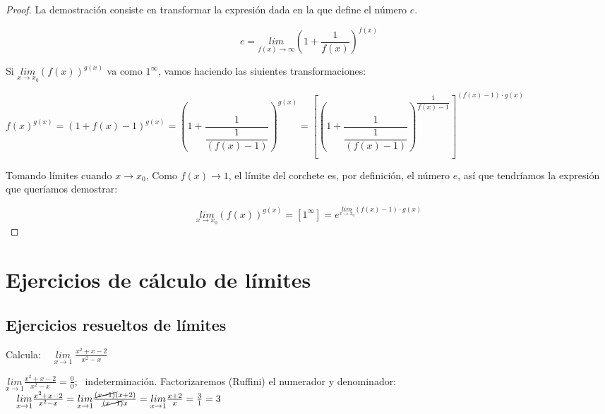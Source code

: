 	
	\begin{proof} La demostración consiste en transformar la expresión dada en la que define el número $e$.
	
		\begin{equation*}
		e=\underset {f(x)\to \infty}{lim} { {\left( 1+\dfrac {1}{f(x)} \right) }^{f(x)}}
		\end{equation*}
		
		Si $ \underset {x\to x_0}{lim}{{\left( f(x)\right)}^{g(x)} } $ va como $1^\infty$, vamos haciendo las siuientes transformaciones:
		
		\scriptsize{\vspace{2mm}$f(x)^{g(x)}= (1+f(x)-1)^{g(x)}=\left(1+\dfrac {1}{\dfrac {1}{(f(x)-1)}} \right)^{g(x)}=\left[  
			\left(1+\dfrac {1}{\dfrac {1}{(f(x)-1)}}\right)^{\dfrac {1}{f(x)-1}} 
			\right]^{(f(x)-1)\cdot g(x)}\quad $ } \normalsize
		
		Tomando límites cuando $x \to x_0$, Como $f(x)\to 1$, el límite del corchete es, por definición, el número $e$, así que tendríamos la expresión que queríamos demostrar:
		
		\begin{equation*}
			 \underset {x\to x_0}{lim}{{\left( f(x)\right)}^{g(x)} }=[1^\infty]=e^{\underset {x \to x_0}{lim}{(f(x)-1)\cdot g(x)}}	
		\end{equation*}
		 
		
	\end{proof}
	
	\section{Ejercicios de cálculo de límites}
	\subsection{Ejercicios resueltos de límites}	
	
	
	\begin{ejre} Calcula: $\quad \underset {x\to 1}{lim}\; { \frac {x^2+x-2}{x^2-x}}$
	
	\end{ejre}
	
	\begin{proofw}\renewcommand{\qedsymbol}{$\diamond$}
	
		$\underset {x\to 1}{lim}{ \frac {x^2+x-2}{x^2-x}}=\frac 0 0; \; $ indeterminación. Factorizaremos (Ruffini) el numerador y {denominador}:
		$\quad \underset {x\to 1}{lim}{ \frac {x^2+x-2}{x^2-x}}=
		\underset {x\to 1}{lim}{ \frac {\cancel{(x-1)}(x+2)}{\cancel{(x-1)}x}} = \underset {x\to 1}{lim}{\frac {x+2}{x}}=\frac 3 1 = 3$
	\end{proofw}
	

